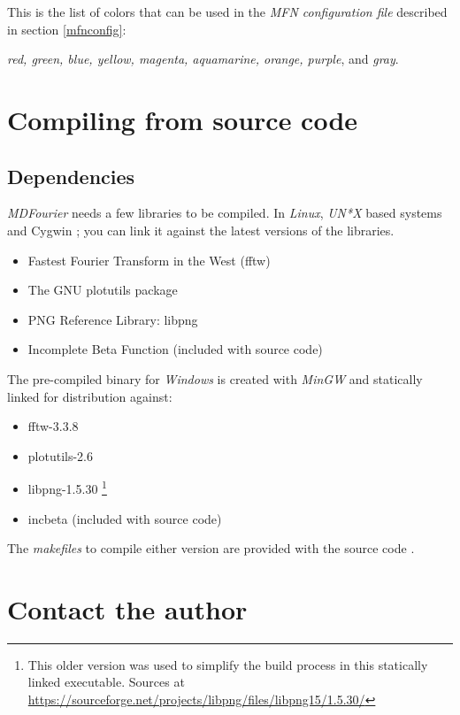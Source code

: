 \documentclass[10pt,a4paper]{report}
\begin{document}
\begin{appendices}
This is the list of colors that can be used in the \textit{MFN configuration file} described in section \ref{mfnconfig}: 

\textit{red, green, blue, yellow, magenta, aquamarine, orange, purple}, and \textit{gray}.

\chapter{Compiling from source code}

\section{Dependencies}

\textit{MDFourier} needs a few libraries to be compiled. In \textit{Linux}, \textit{UN*X} based systems and Cygwin \cite{cygwin}; you can link it against the latest versions of the libraries. 

\begin{itemize}
	\item Fastest Fourier Transform in the West (fftw) \cite{fftw}
	\item The GNU plotutils package \cite{libplot}
	\item PNG Reference Library: libpng \cite{libpng}
	\item Incomplete Beta Function \cite{betafunction} (included with source code)
\end{itemize}

The pre-compiled binary for \textit{Windows} is created with \textit{MinGW}\cite{mingw} and statically linked for distribution against:

\begin{itemize}
	\item fftw-3.3.8 \cite{fftw}
	\item plotutils-2.6 \cite{libplot}
	\item libpng-1.5.30 \footnote{This older version was used to simplify the build process in this statically linked executable. Sources at \url{https://sourceforge.net/projects/libpng/files/libpng15/1.5.30/}}
	\item incbeta \cite{betafunction} (included with source code)
\end{itemize}

The \textit{makefiles} to compile either version are provided with the source code \cite{sourcecode}.

\chapter{Contact the author}
\label{contact}


\end{appendices}
\end{document}

